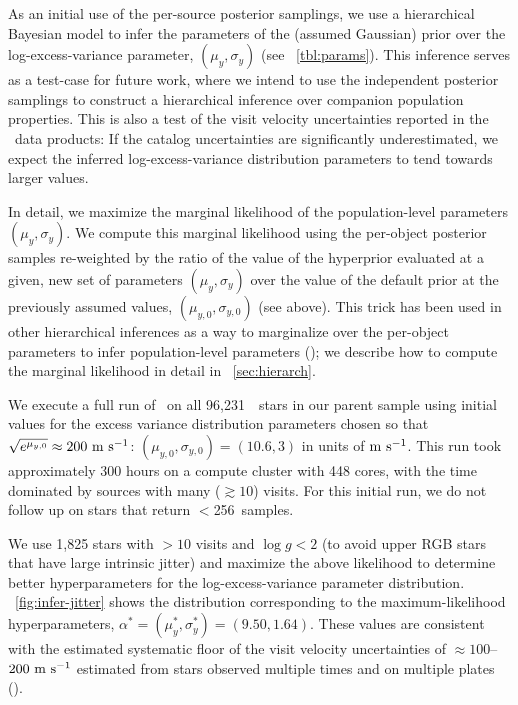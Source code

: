 \documentclass[modern, letterpaper]{aastex62}
\newcommand{\apogee}{\project{\acronym{APOGEE}}}
\newcommand{\thejoker}{\project{The~Joker}}
\newcommand{\nposterior}{256}
\newcommand{\nstars}{96,231}
\begin{document}
As an initial use of the per-source posterior samplings, we use a hierarchical
Bayesian model to infer the parameters of the (assumed Gaussian) prior over the
log-excess-variance parameter, $(\mu_y, \sigma_y)$ (see
\tablename~\ref{tbl:params}).
This inference serves as a test-case for future work, where we intend to use the
independent posterior samplings to construct a hierarchical inference over
companion population properties.
This is also a test of the visit velocity uncertainties reported in the \apogee\
data products: If the catalog uncertainties are significantly underestimated, we
expect the inferred log-excess-variance distribution parameters to tend towards
larger values.

In detail, we maximize the marginal likelihood of the population-level
parameters $(\mu_y, \sigma_y)$.
We compute this marginal likelihood using the per-object posterior samples
re-weighted by the ratio of the value of the hyperprior evaluated at a given,
new set of parameters $(\mu_y, \sigma_y)$ over the value of the default prior at
the previously assumed values, $(\mu_{y,0}, \sigma_{y,0})$ (see above).
This trick has been used in other hierarchical inferences as a way to
marginalize over the per-object parameters to infer population-level parameters
(\citealt{Hogg:2010,Foreman-Mackey:2014}); we describe how to compute the
marginal likelihood in detail in \sectionname~\ref{sec:hierarch}.

We execute a full run of \thejoker\ on all \nstars\ \apogee\ stars in our parent
sample using initial values for the excess variance distribution parameters
chosen so that $\sqrt{e^{\mu_{y,0}}} \approx 200~\mathrm{m}~\mathrm{s}^{-1}$: $(\mu_{y,0},
\sigma_{y,0}) = (10.6, 3)$ in units of $\mathrm{m}~\mathrm{s}^{-1}$.
This run took approximately 300 hours on a compute cluster with 448 cores, with
the time dominated by sources with many ($\gtrsim 10$) visits.  For this initial
run, we do not follow up on stars that return $<$\nposterior\ samples.

We use 1,825 stars with $>10$ visits and $\log g < 2$ (to avoid upper RGB stars
that have large intrinsic jitter) and maximize the above likelihood to determine
better hyperparameters for the log-excess-variance parameter distribution.
\figurename~\ref{fig:infer-jitter} shows the distribution corresponding to the
maximum-likelihood hyperparameters, $\alpha^* = (\mu_y^*, \sigma_y^*) = (9.50,
1.64)$.
These values are consistent with the estimated systematic floor of the visit
velocity uncertainties of $\approx 100$--$200~\mathrm{m}~\mathrm{s}^{-1}$ estimated from stars
observed multiple times and on multiple plates (\citealt{Nidever:2015}).
\end{document}
